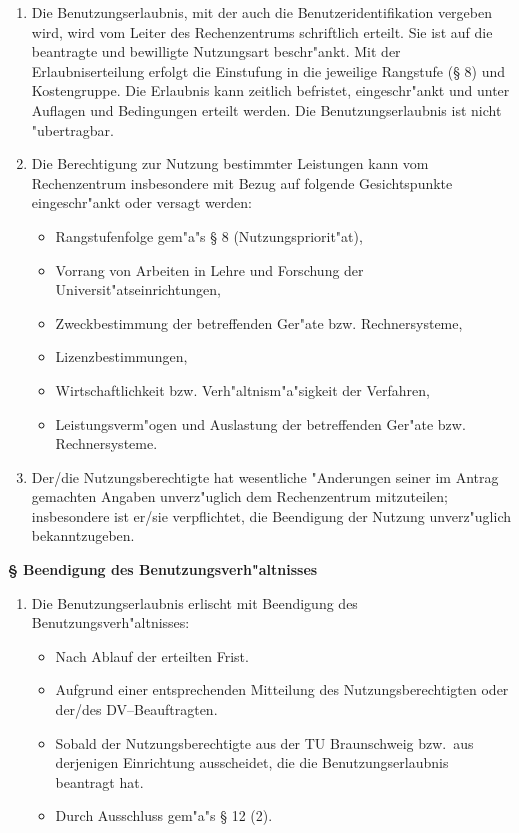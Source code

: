 \documentclass[12pt,titlepage,twoside]{scrartcl}
\newcounter{para_nr}
\newcommand{\Paragraph}[1]{{\large\bf\S{}\sf\textbf{\/\stepcounter{para_nr}\arabic{para_nr} #1}}}
\begin{document}
\begin{appendix}
\begin{enumerate}
  \item Die Benutzungserlaubnis, mit der auch die Benutzeridentifikation
    vergeben wird, wird vom Leiter des Rechenzentrums schriftlich erteilt. Sie
    ist auf die beantragte und bewilligte Nutzungsart beschr"ankt. Mit der
    Erlaubniserteilung erfolgt die Einstufung in die jeweilige Rangstufe (\S{} 8)
    und Kostengruppe. Die Erlaubnis kann zeitlich befristet, eingeschr"ankt
    und unter Auflagen und Bedingungen erteilt werden. Die Benutzungserlaubnis
    ist nicht "ubertragbar.

  \item Die Berechtigung zur Nutzung bestimmter Leistungen kann vom
    Rechenzentrum insbesondere mit Bezug auf folgende Gesichtspunkte
    eingeschr"ankt oder versagt werden:

    \begin{itemize}
      \item Rangstufenfolge gem"a"s \S{} 8 (Nutzungspriorit"at),
      \item Vorrang von Arbeiten in Lehre und Forschung der
        Universit"atseinrichtungen,
      \item Zweckbestimmung der betreffenden Ger"ate bzw. Rechnersysteme,
      \item Lizenzbestimmungen,
      \item Wirtschaftlichkeit bzw. Verh"altnism"a"sigkeit der
        Verfahren,
      \item Leistungsverm"ogen und Auslastung der betreffenden
        Ger"ate bzw. Rechnersysteme.
    \end{itemize}

 \item Der/die Nutzungsberechtigte hat wesentliche "Anderungen seiner im
   Antrag gemachten Angaben unverz"uglich dem Rechenzentrum mitzuteilen;
   insbesondere ist er/sie verpflichtet, die Beendigung der Nutzung
   unverz"uglich bekanntzugeben.
\end{enumerate}

\Paragraph{Beendigung des Benutzungsverh"altnisses}

\begin{enumerate}
  \item Die Benutzungserlaubnis erlischt mit Beendigung des
    Benutzungsverh"altnisses:
    \begin{itemize}
      \item Nach Ablauf der erteilten Frist.
      \item Aufgrund einer entsprechenden Mitteilung des Nutzungsberechtigten
        oder der/des DV--Beauftragten.
      \item Sobald der Nutzungsberechtigte aus der TU Braunschweig bzw.\  aus
        derjenigen Einrichtung ausscheidet, die die Benutzungserlaubnis
        beantragt hat.
      \item Durch Ausschluss gem"a"s \S{} 12 (2).
    \end{itemize}


\end{enumerate}
\end{appendix}
\end{document}
